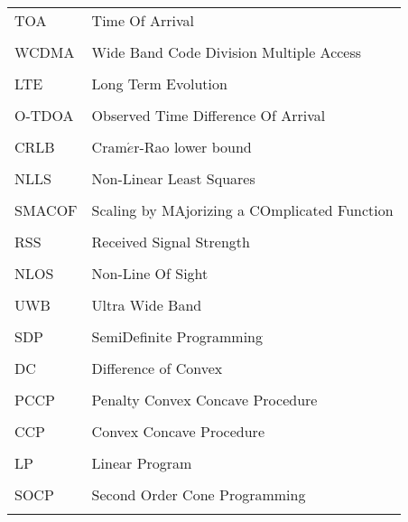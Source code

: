 \begin{longtable}[h]{l l}
\\
TOA & Time Of Arrival \\
\\
WCDMA & Wide Band Code Division Multiple Access \\
\\
LTE & Long Term Evolution \\
\\
O-TDOA & Observed Time Difference Of Arrival\\
\\
CRLB & Cram$\acute{e}$r-Rao  lower  bound \\
\\
NLLS & Non-Linear Least Squares \\
\\
SMACOF & Scaling by MAjorizing a COmplicated Function \\
\\
RSS & Received Signal Strength \\
\\
NLOS & Non-Line Of Sight \\
\\
UWB & Ultra Wide Band \\
\\
SDP & SemiDefinite Programming \\
\\
DC & Difference of Convex \\
\\
PCCP & Penalty Convex Concave Procedure \\
\\
CCP & Convex Concave Procedure \\
\\
LP & Linear Program \\
\\
SOCP & Second Order Cone Programming \\
\\
\end{longtable}
